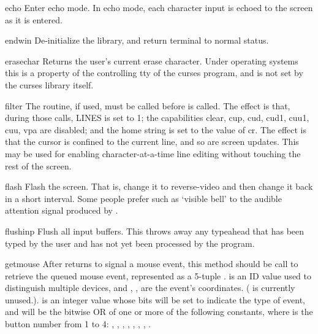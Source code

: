\begin{funcdesc}{echo}{}
Enter echo mode.  In echo mode, each character input is echoed to the
screen as it is entered.  
\end{funcdesc}

\begin{funcdesc}{endwin}{}
De-initialize the library, and return terminal to normal status.
\end{funcdesc}

\begin{funcdesc}{erasechar}{}
Returns the user's current erase character.  Under \UNIX{} operating
systems this is a property of the controlling tty of the curses
program, and is not set by the curses library itself.
\end{funcdesc}

\begin{funcdesc}{filter}{}
The  routine, if used, must be called before
 is  called.  The effect is that, during those
calls, LINES is set to 1; the capabilities clear, cup, cud, cud1,
cuu1, cuu, vpa are disabled; and the home string is set to the value of cr.
The effect is that the cursor is confined to the current line, and so
are screen updates.  This may be used for enabling character-at-a-time 
line editing without touching the rest of the screen.
\end{funcdesc}

\begin{funcdesc}{flash}{}
Flash the screen.  That is, change it to reverse-video and then change
it back in a short interval.  Some people prefer such as `visible bell'
to the audible attention signal produced by .
\end{funcdesc}

\begin{funcdesc}{flushinp}{}
Flush all input buffers.  This throws away any  typeahead  that  has
been typed by the user and has not yet been processed by the program.
\end{funcdesc}

\begin{funcdesc}{getmouse}{}
After  returns  to signal a mouse
event, this method should be call to retrieve the queued mouse event,
represented as a 5-tuple
.
 is an ID value used to distinguish multiple devices,
and , ,  are the event's coordinates.  (
is currently unused.).   is an integer value whose bits
will be set to indicate the type of event, and will be the bitwise OR
of one or more of the following constants, where  is the button
number from 1 to 4:
,
,
,
,
,
,
,
.
\end{funcdesc}

